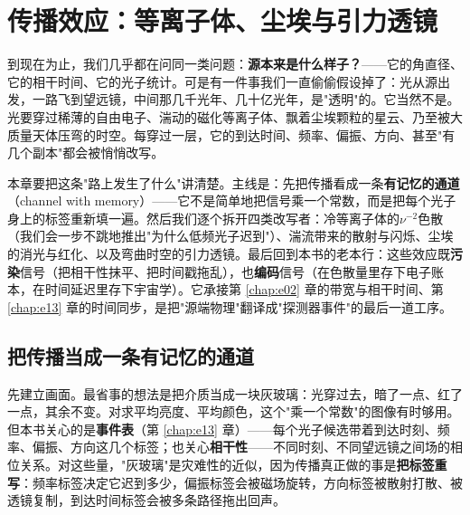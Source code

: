 \chapter{传播效应：等离子体、尘埃与引力透镜}
\label{chap:e21}

\begin{chapteropening}
到现在为止，我们几乎都在问同一类问题：\textbf{源本来是什么样子？}——它的角直径、它的相干时间、它的光子统计。可是有一件事我们一直偷偷假设掉了：光从源出发，一路飞到望远镜，中间那几千光年、几十亿光年，是"透明"的。它当然不是。光要穿过稀薄的自由电子、湍动的磁化等离子体、飘着尘埃颗粒的星云、乃至被大质量天体压弯的时空。每穿过一层，它的到达时间、频率、偏振、方向、甚至"有几个副本"都会被悄悄改写。

本章要把这条"路上发生了什么"讲清楚。主线是：先把传播看成一条\textbf{有记忆的通道}（channel with memory）——它不是简单地把信号乘一个常数，而是把每个光子身上的标签重新填一遍。然后我们逐个拆开四类改写者：冷等离子体的\(\nu^{-2}\)色散（我们会一步不跳地推出"为什么低频光子迟到"）、湍流带来的散射与闪烁、尘埃的消光与红化、以及弯曲时空的引力透镜。最后回到本书的老本行：这些效应既\textbf{污染}信号（把相干性抹平、把时间戳拖乱），也\textbf{编码}信号（在色散量里存下电子账本，在时间延迟里存下宇宙学）。它承接第 \ref{chap:e02} 章的带宽与相干时间、第 \ref{chap:e13} 章的时间同步，是把"源端物理"翻译成"探测器事件"的最后一道工序。
\end{chapteropening}

\section{把传播当成一条有记忆的通道}
\label{sec:e21-channel}

先建立画面。最省事的想法是把介质当成一块灰玻璃：光穿过去，暗了一点、红了一点，其余不变。对求平均亮度、平均颜色，这个"乘一个常数"的图像有时够用。但本书关心的是\textbf{事件表}（第 \ref{chap:e13} 章）——每个光子候选带着到达时刻、频率、偏振、方向这几个标签；也关心\textbf{相干性}——不同时刻、不同望远镜之间场的相位关系。对这些量，"灰玻璃"是灾难性的近似，因为传播真正做的事是\textbf{把标签重写}：频率标签决定它迟到多少，偏振标签会被磁场旋转，方向标签被散射打散、被透镜复制，到达时间标签会被多条路径拖出回声。


